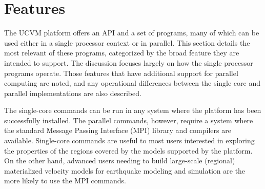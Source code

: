 
\section{Features}
\label{sec:features}

The UCVM platform offers an API and a set of programs, many of which can be used either in a single processor context or in parallel. This section details the most relevant of these programs, categorized by the broad feature they are intended to support. The discussion focuses largely on how the single processor programs operate. Those features that have additional support for parallel computing are noted, and any operational differences between the single core and parallel implementations are also described.

The single-core commands can be run in any system where the platform has been successfully installed. The parallel commands, however, require a system where the standard Message Passing Interface (MPI) library and compilers are available. Single-core commands are useful to most users interested in exploring the properties of the regions covered by the models supported by the platform. On the other hand, advanced users needing to build large-scale (regional) materialized velocity models for earthquake modeling and simulation are the more likely to use the MPI commands. 









